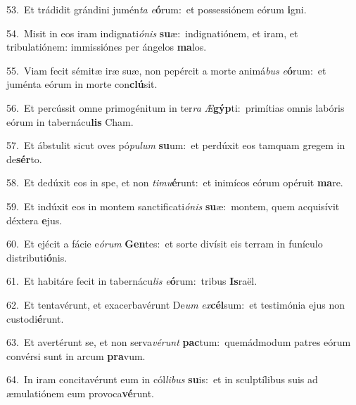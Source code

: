 {\numbfont\textcolor{\numbcolor}{53.}}~Et trádidit grándini jumén\textit{ta} \textit{e}\-\textbf{ó}rum:~\star et possessiónem eórum \textbf{i}\-gni.\par
{\numbfont\textcolor{\numbcolor}{54.}}~Misit in eos iram indignati\-\textit{ó}\-\textit{nis} \textbf{su}\-æ:~\star indignatiónem, et iram, et tribulatiónem: immissiónes per ángelos \textbf{ma}\-los.\par
{\numbfont\textcolor{\numbcolor}{55.}}~Viam fecit sémitæ iræ suæ, non pepércit a morte animá\textit{bus} \textit{e}\-\textbf{ó}rum:~\star et juménta eórum in morte con\-\textbf{clú}\-sit.\par
{\numbfont\textcolor{\numbcolor}{56.}}~Et percússit omne primogénitum in ter\textit{ra} \textit{Æ}\-\textbf{gýp}ti:~\star primítias omnis labóris eórum in tabernácu\textbf{lis} Cham.\par
{\numbfont\textcolor{\numbcolor}{57.}}~Et ábstulit sicut oves pó\-\textit{pu}\-\textit{lum} \textbf{su}\-um:~\star et perdúxit eos tamquam gregem in de\-\textbf{sér}\-to.\par
{\numbfont\textcolor{\numbcolor}{58.}}~Et dedúxit eos in spe, et non \textit{ti}\-\textit{mu}\textbf{é}runt:~\star et inimícos eórum opéruit \textbf{ma}\-re.\par
{\numbfont\textcolor{\numbcolor}{59.}}~Et indúxit eos in montem sanctificati\-\textit{ó}\-\textit{nis} \textbf{su}\-æ:~\star montem, quem acquisívit déxtera \textbf{e}\-jus.\par
{\numbfont\textcolor{\numbcolor}{60.}}~Et ejécit a fácie e\-\textit{ó}\-\textit{rum} \textbf{Gen}\-tes:~\star et sorte divísit eis terram in funículo distributi\-\textbf{ó}\-nis.\par
{\numbfont\textcolor{\numbcolor}{61.}}~Et habitáre fecit in tabernácu\textit{lis} \textit{e}\-\textbf{ó}rum:~\star tribus \textbf{Is}\-raël.\par
{\numbfont\textcolor{\numbcolor}{62.}}~Et tentavérunt, et exacerbavérunt De\textit{um} \textit{ex}\-\textbf{cél}sum:~\star et testimónia ejus non custodi\-\textbf{é}\-runt.\par
{\numbfont\textcolor{\numbcolor}{63.}}~Et avertérunt se, et non serva\-\textit{vé}\-\textit{runt} \textbf{pac}\-tum:~\star quemádmodum patres eórum convérsi sunt in arcum \textbf{pra}\-vum.\par
{\numbfont\textcolor{\numbcolor}{64.}}~In iram concitavérunt eum in cól\-\textit{li}\-\textit{bus} \textbf{su}\-is:~\star et in sculptílibus suis ad æmulatiónem eum provoca\-\textbf{vé}\-runt.\par
